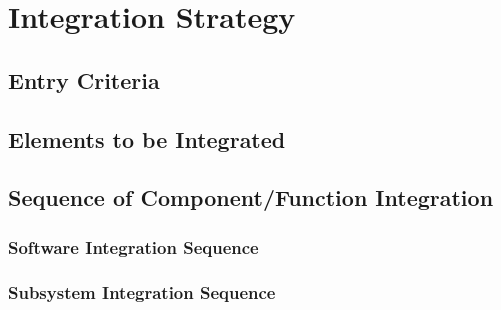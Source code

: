 \section{Integration Strategy}
\subsection{Entry Criteria	}
\subsection{Elements to be Integrated}
\subsection{Sequence of Component/Function Integration}
\subsubsection{Software Integration Sequence}
\subsubsection{Subsystem Integration Sequence}